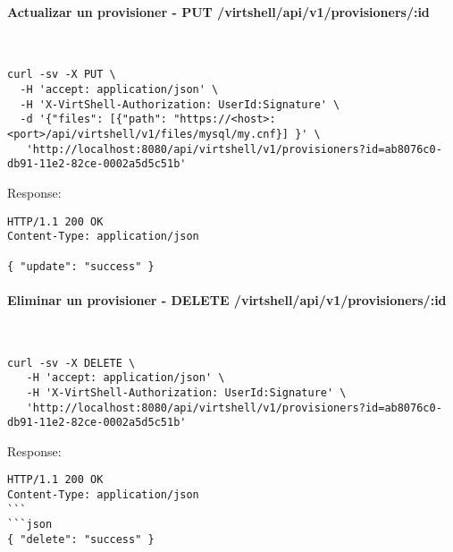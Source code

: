 \paragraph{Actualizar un provisioner - PUT /virtshell/api/v1/provisioners/:id} ~\\

\begin{lstlisting}[style=json]
curl -sv -X PUT \
  -H 'accept: application/json' \
  -H 'X-VirtShell-Authorization: UserId:Signature' \
  -d '{"files": [{"path": "https://<host>:<port>/api/virtshell/v1/files/mysql/my.cnf}] }' \
   'http://localhost:8080/api/virtshell/v1/provisioners?id=ab8076c0-db91-11e2-82ce-0002a5d5c51b'
\end{lstlisting}

Response:

\begin{lstlisting}[style=json]
HTTP/1.1 200 OK
Content-Type: application/json

{ "update": "success" }
\end{lstlisting}

\paragraph{Eliminar un provisioner - DELETE /virtshell/api/v1/provisioners/:id} ~\\

\begin{lstlisting}[style=json]
curl -sv -X DELETE \
   -H 'accept: application/json' \
   -H 'X-VirtShell-Authorization: UserId:Signature' \
   'http://localhost:8080/api/virtshell/v1/provisioners?id=ab8076c0-db91-11e2-82ce-0002a5d5c51b'
\end{lstlisting}

Response:

\begin{lstlisting}[style=json]
HTTP/1.1 200 OK
Content-Type: application/json
```
```json
{ "delete": "success" }
\end{lstlisting}